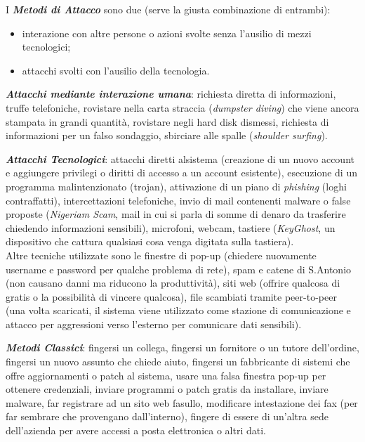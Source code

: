 \documentclass[a4paper, notitlepage, 9pt]{extreport}
\begin{document}
\noindent
I \textit{\textbf{Metodi di Attacco}} sono due (serve la giusta combinazione di entrambi):
\begin{itemize}
	\item interazione con altre persone o azioni svolte senza l'ausilio di mezzi tecnologici;
	\item attacchi svolti con l'ausilio della tecnologia.
\end{itemize}
\textit{\textbf{Attacchi mediante interazione umana}}: richiesta diretta di informazioni, truffe telefoniche, rovistare nella carta straccia (\textit{dumpster diving}) che viene ancora stampata in grandi quantità, rovistare negli hard disk dismessi, richiesta di informazioni per un falso sondaggio, sbirciare alle spalle (\textit{shoulder surfing}).

\noindent
\textit{\textbf{Attacchi Tecnologici}}: attacchi diretti alsistema (creazione di un nuovo account e aggiungere privilegi o diritti di accesso a un account esistente), esecuzione di un programma malintenzionato (trojan), attivazione di un piano di \textit{phishing} (loghi contraffatti), intercettazioni telefoniche, invio di mail contenenti malware o false proposte (\textit{Nigeriam Scam}, mail in cui si parla di somme di denaro da trasferire chiedendo informazioni sensibili), microfoni, webcam, tastiere (\textit{KeyGhost}, un dispositivo che cattura qualsiasi cosa venga digitata sulla tastiera).\\
Altre tecniche utilizzate sono le finestre di pop-up (chiedere nuovamente username e password per qualche problema di rete), spam e catene di S.Antonio (non causano danni ma riducono la produttività), siti web (offrire qualcosa di gratis o la possibilità di vincere qualcosa), file scambiati tramite peer-to-peer (una volta scaricati, il sistema viene utilizzato come stazione di comunicazione e attacco per aggressioni verso l'esterno per comunicare dati sensibili).
\newline

\noindent
\textit{\textbf{Metodi Classici}}: fingersi un collega, fingersi un fornitore o un tutore dell'ordine, fingersi un nuovo assunto che chiede aiuto, fingersi un fabbricante di sistemi che offre aggiornamenti o patch al sistema, usare una falsa finestra pop-up per ottenere credenziali, inviare programmi o patch gratis da installare, inviare malware, far registrare ad un sito web fasullo, modificare intestazione dei fax (per far sembrare che provengano dall'interno), fingere di essere di un'altra sede dell'azienda per avere accessi a posta elettronica o altri dati.
\end{document}
